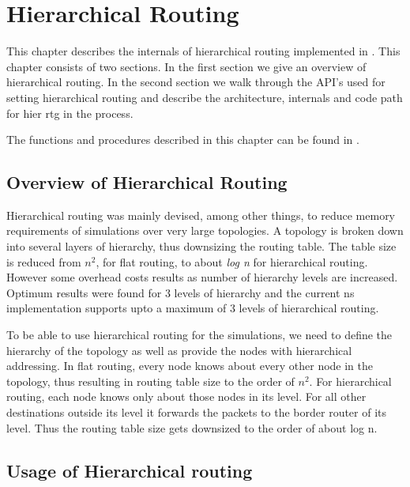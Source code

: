 \chapter{Hierarchical Routing}
\label{chap:hier-rtg}

This chapter describes the internals of hierarchical routing
implemented in \ns.
This chapter consists of two sections. In the first section we give an
overview of hierarchical routing. In the second section we walk through
the API's used for setting hierarchical routing and describe the
architecture, internals and code path for hier rtg in the process.

The functions and procedures described in this chapter can be found in
. 

\section{Overview of Hierarchical Routing}
\label{sec:over-hier-rtg}

Hierarchical routing was mainly devised, among other things, to reduce
memory requirements of simulations over very large topologies. A
topology is broken down into several layers of hierarchy, thus
downsizing the routing table. The table size is reduced from 
{\em {$n^{2}$}}, for flat routing, to about {\em log n} for 
hierarchical routing. However some overhead costs results as 
number of hierarchy levels are increased. Optimum results were found for
3 levels of hierarchy and the current ns implementation supports upto a
maximum of 3 levels of hierarchical routing. 

To be able to use hierarchical routing for the simulations, we need to
define the hierarchy of the topology as well as provide the nodes with
hierarchical addressing. In flat routing, every node knows about every
other node in the topology, thus resulting in routing table size to the
order of 
$n^{2}$. For hierarchical routing, each node knows only about
those nodes in its level. For all other destinations outside its level
it forwards the packets to the border router of its level. Thus the
routing table size gets downsized to the order of about log n.

\section{Usage of Hierarchical routing}
\label{sec:usage-hier-rtg} 

